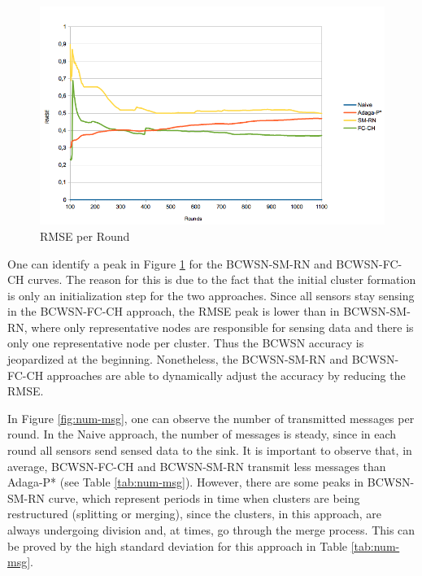 \documentclass[conference]{IEEEtran}
\begin{document}
\begin{figure}[!htb]
\centering
	\includegraphics[scale=0.33]{WsneeFD_RMSE.png}
    \caption{RMSE per Round}
    \label{fig:rmse}
\end{figure}

One can identify a peak in Figure \ref{fig:rmse} for the BCWSN-SM-RN and
BCWSN-FC-CH curves. The reason for this is due to the fact that the initial
cluster formation is only an initialization step for the two approaches.
Since all sensors stay sensing in the BCWSN-FC-CH approach, the RMSE peak is
lower than in BCWSN-SM-RN, where only representative nodes are responsible for
sensing data and there is only one representative node per cluster.
Thus the BCWSN accuracy is jeopardized at the beginning. Nonetheless, the
BCWSN-SM-RN and BCWSN-FC-CH approaches are able to dynamically adjust the
accuracy by reducing the RMSE.

In Figure \ref{fig:num-msg}, one can observe the number of transmitted messages
per round. In the Naive approach, the number of messages is steady, since in
each round all sensors send sensed data to the sink. It is important to observe
that, in average, BCWSN-FC-CH and BCWSN-SM-RN transmit less messages than Adaga-P*
(see Table \ref{tab:num-msg}). However, there are some peaks in BCWSN-SM-RN
curve, which represent periods in time when clusters are being restructured
(splitting or merging), since the clusters, in this approach, are always
undergoing division and, at times, go through the merge process. This can be
proved by the high standard deviation for this approach in Table
\ref{tab:num-msg}.
\end{document}
